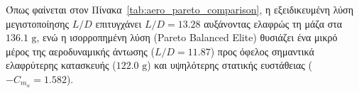 

Όπως φαίνεται στον Πίνακα~\ref{tab:aero_pareto_comparison}, η εξειδικευμένη λύση μεγιστοποίησης $L/D$ επιτυγχάνει $L/D = 13.28$ αυξάνοντας ελαφρώς τη μάζα στα $136.1\text{ g}$, ενώ η ισορροπημένη λύση (Pareto Balanced Elite) θυσιάζει ένα μικρό μέρος της αεροδυναμικής άντωσης ($L/D = 11.87$) προς όφελος σημαντικά ελαφρύτερης κατασκευής ($122.0\text{ g}$) και υψηλότερης στατικής ευστάθειας ($-C_{m_\alpha} = 1.582$).
